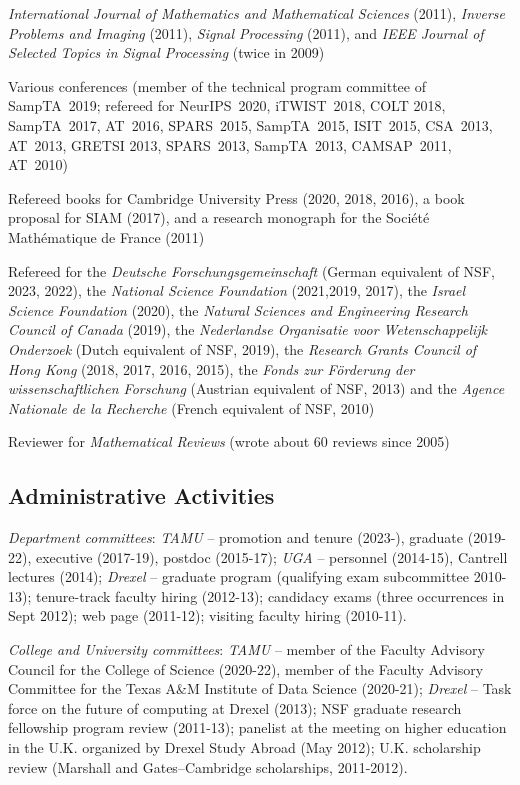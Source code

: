 \documentclass[11pt]{article}
\begin{document}
{\sl International Journal of Mathematics and Mathematical Sciences} (2011),
{\sl Inverse Problems and Imaging} (2011),
{\sl Signal Processing} (2011),
and
{\sl IEEE Journal of Selected Topics in Signal Processing} (twice in 2009)
\item Various conferences 
(member of the technical program committee of SampTA~2019;
refereed for NeurIPS~2020,
 iTWIST~2018, COLT 2018, SampTA~2017, AT~2016, SPARS~2015, SampTA~2015, ISIT~2015, CSA~2013, AT~2013, GRETSI 2013, SPARS~2013, SampTA~2013, CAMSAP~2011, AT~2010)
\item Refereed 
books for Cambridge University Press (2020, 2018, 2016),
a book proposal for SIAM (2017),
and a research monograph for the Soci\'{e}t\'{e} Math\'{e}matique de France (2011)
\item Refereed for the 
{\sl Deutsche Forschungsgemeinschaft} (German equivalent of NSF, 2023, 2022),
the
{\sl National Science Foundation} (2021,2019, 2017),
the
{\sl Israel Science Foundation} (2020),
the
{\sl Natural Sciences and Engineering Research Council of Canada} (2019),
the
{\sl Nederlandse Organisatie voor Wetenschappelijk Onderzoek} (Dutch equivalent of NSF, 2019),
the
{\sl Research Grants Council of Hong Kong} (2018, 2017, 2016, 2015),
the 
{\sl Fonds zur F\"orderung der wissenschaftlichen Forschung} (Austrian equivalent of NSF, 2013) 
and the
 {\sl Agence Nationale de la Recherche} (French equivalent of NSF, 2010)
\item Reviewer for {\sl Mathematical Reviews} (wrote about 60 reviews since 2005)
 \eitemize
 
 \vspace{0mm}
 
\subsection{Administrative Activities}
\bitemize
\item {\sl Department committees}:  
{\sl TAMU} -- promotion and tenure (2023-), 
graduate (2019-22), executive (2017-19), postdoc (2015-17);
{\sl UGA} -- personnel (2014-15), Cantrell lectures (2014); 
{\sl Drexel} -- 
graduate program (qualifying exam subcommittee 2010-13);
tenure-track faculty hiring (2012-13); 
candidacy exams (three occurrences in Sept 2012);
web page (2011-12);
visiting faculty hiring (2010-11).
\item {\sl College and University committees}: 
{\sl TAMU} -- 
member of the Faculty Advisory Council for the College of Science (2020-22),
member of the Faculty Advisory Committee for the Texas A\&M Institute of Data Science (2020-21);
{\sl Drexel} -- 
Task force on the future of computing at Drexel (2013);
NSF graduate research fellowship program review (2011-13);
panelist at the meeting on higher education in the U.K. organized by Drexel Study Abroad (May 2012); 
U.K. scholarship review  (Marshall and Gates--Cambridge scholarships, 2011-2012).
\eitemize 
 
\end{document}
